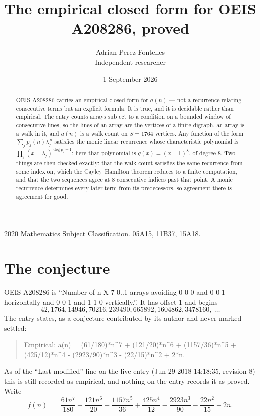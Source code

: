 \documentclass[11pt,a4paper]{article}
\title{The empirical closed form for OEIS A208286, proved}
\author{Adrian Perez Fontelles\\ \small Independent researcher}
\date{1 September 2026}
\theoremstyle{plain}
\theoremstyle{definition}
\begin{document}
\maketitle

\begin{abstract}
OEIS A208286 carries an empirical closed form for $a(n)$ --- not a recurrence relating
consecutive terms but an explicit formula. It is true, and it is decidable rather than
empirical. The entry counts arrays subject to a condition on a bounded window of consecutive lines, so the lines of an array are the
vertices of a finite digraph, an array is a walk in it, and $a(n)$ is a walk count on
$S=1764$ vertices. Any function of the form $\sum_j p_j(n)\lambda_j^{\,n}$ satisfies the
monic linear recurrence whose characteristic polynomial is
$\prod_j(x-\lambda_j)^{\deg p_j+1}$; here that polynomial is $q(x)=(x-1)^{8}$, of degree
$8$. Two things are then checked exactly: that the walk count satisfies the same
recurrence from some index on, which the Cayley--Hamilton theorem reduces to a finite
computation, and that the two sequences agree at $8$ consecutive indices past that
point. A monic recurrence determines every later term from its predecessors, so agreement
there is agreement for good.
\end{abstract}

\noindent\small 2020 Mathematics Subject Classification. 05A15, 11B37, 15A18.\normalsize

\section{The conjecture}

OEIS A208286 is ``Number of n X 7 0..1 arrays avoiding 0 0 0 and 0 0 1 horizontally and 0 0 1 and 1 1 0 vertically.''. It has offset $1$ and begins
\[
42, 1764, 14946, 70216, 239490, 665892, 1604862, 3478160,\ \dots
\]
The entry states, as a conjecture contributed by its author and never marked settled:
\begin{quote}
Empirical: a(n) = (61/180)*n\^{}7 + (121/20)*n\^{}6 + (1157/36)*n\^{}5 + (425/12)*n\^{}4 - (2923/90)*n\^{}3 - (22/15)*n\^{}2 + 2*n.
\end{quote}
As of the ``Last modified'' line on the live entry (Jun 29 2018 14:18:35, revision 8) this is still
recorded as empirical, and nothing on the entry records it as proved. Write
\[
f(n)\;=\;\frac{61 n^{7}}{180} + \frac{121 n^{6}}{20} + \frac{1157 n^{5}}{36} + \frac{425 n^{4}}{12} - \frac{2923 n^{3}}{90} - \frac{22 n^{2}}{15} + 2 n.
\]
\end{document}
